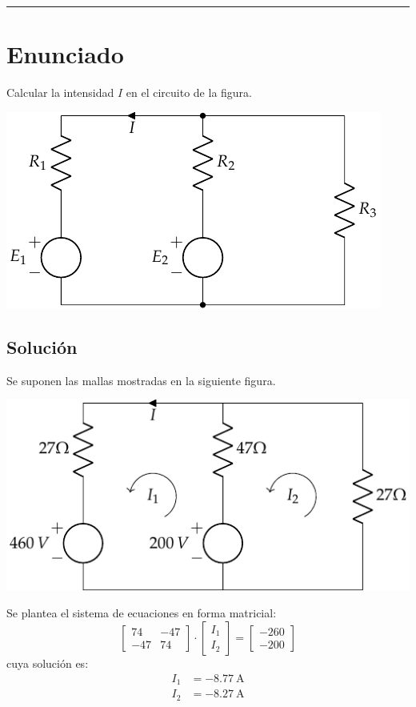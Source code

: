 \noindent\rule{\linewidth}{2.8pt}


\section{Enunciado}
Calcular la intensidad $I$ en el circuito de la figura.

\begin{center}
  \includegraphics{figuras/BT1_04.pdf}
\end{center}


\subsection*{Solución}
Se suponen las mallas mostradas en la siguiente figura.

\begin{center}
  \includegraphics{figuras/BT1_04_mallas.pdf}
\end{center}

Se plantea el sistema de ecuaciones en forma matricial:
\begin{equation*}
  \begin{bmatrix}
    74 & -47  \\
    -47 & 74
  \end{bmatrix} \cdot
  \begin{bmatrix}
    I_1\\
    I_2
  \end{bmatrix} =
  \begin{bmatrix}
    -260 \\
    -200
  \end{bmatrix}
\end{equation*}
cuya solución es:
\begin{align*}
  I_1&=\qty{-8.77}{\ampere}\\
  I_2&=\qty{-8.27}{\ampere}
\end{align*}

